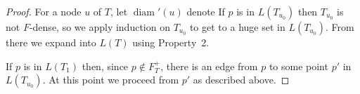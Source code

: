 \documentclass{patmorin}
\DeclareMathOperator{\diam}{diam}
\begin{document}
\begin{proof}

  For a node $u$ of $T$, let $\diam'(u)$ denote 
  If $p$ is in $L(T_{u_0})$ then $T_{u_0}$ is not $F$-dense, so we apply
  induction on $T_{u_0}$ to get to a huge set in $L(T_{u_0})$. From
  there we expand into $L(T)$ using Property~2.

  If $p$ is in $L(T_1)$ then, since $p\not\in F^+_T$, there is an edge
  from $p$ to some point $p'$ in $L(T_{u_0})$.  At this point we proceed
  from $p'$ as described above.
\end{proof}




\end{document}
